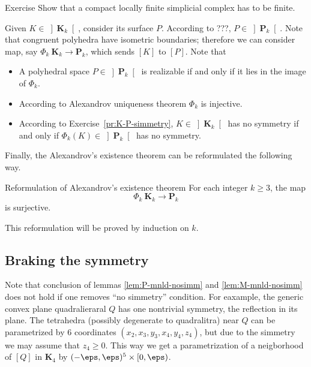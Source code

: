 \begin{thm}{Exercise}
Show that a compact locally finite simplicial complex has to be finite. 
\end{thm}







Given $K\in \left]\mathbf{K}_k\right[$,
consider its surface $P$.
According to ???, $P\in \left]\mathbf{P}_k\right[$.
Note that congruent polyhedra have isometric boundaries;
therefore we can consider map, say $\Phi_k\:\mathbf{K}_k\to\mathbf{P}_k$,
which sends $[K]$ to $[P]$.
Note that 
\begin{itemize}
\item A polyhedral space $P\in\left]\mathbf{P}_k\right[$ 
is realizable if and only if it 
lies in the image of $\Phi_k$.
\item According to Alexandrov uniqueness theorem $\Phi_k$ is injective.
\item According to Exercise~\ref{pr:K-P-simmetry}, $K\in \left]\mathbf{K}_k\right[$ has no symmetry if and only if $\Phi_k(K)\in\left]\mathbf{P}_k\right[$ has no symmetry. 
\end{itemize}

Finally,
the Alexandrov's existence theorem can be reformulated the following way.

\begin{thm}{Reformulation of Alexandrov's existence theorem}
For each integer $k\ge 3$, the map 
$$\Phi_k\:\mathbf{K}_k\to \mathbf{P}_k$$ 
is surjective.
\end{thm}

This reformulation will be proved by induction on $k$.











\subsection*{Braking the symmetry}

Note that conclusion of lemmas \ref{lem:P-mnld-nosimm} and \ref{lem:M-mnld-nosimm}
does not hold if one removes ``no simmetry'' condition.
For eaxample, the generic convex plane quadralieraral $Q$ 
has one nontrivial symmetry, the reflection in its plane.
The tetrahedra (possibly degenerate to quadralitra) near $Q$ 
can be parametrized by $6$ coordinates
$(x_2,x_3,y_3,x_4,y_4,z_4)$,
but due to the simmetry we may assume that $z_4\ge 0$.
This way we get a parametrization of a neigborhood of $[Q]$ in $\mathbf{K}_4$ 
by $(-\eps,\eps)^5\times [0,\eps)$.


